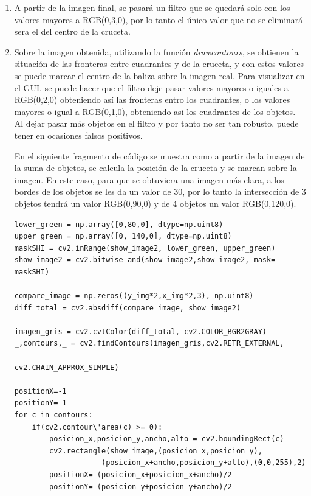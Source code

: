 \begin{enumerate}
	\item A partir de la imagen final, se pasar\'a un filtro que se quedar\'a solo con los valores mayores a RGB(0,3,0), por lo tanto el \'unico valor que no se eliminar\'a sera el del centro de la cruceta.

	\item Sobre la imagen obtenida, utilizando la funci\'on \textit{drawcontours}, se obtienen la situaci\'on de las fronteras entre cuadrantes y de la cruceta, y con estos valores se puede marcar el centro de la baliza sobre la imagen real. Para visualizar en el GUI, se puede hacer que el filtro deje pasar valores mayores o iguales a RGB(0,2,0) obteniendo as\'i las fronteras entro los cuadrantes, o los valores mayores o igual a RGB(0,1,0), obteniendo asi los cuadrantes de los objetos. Al dejar pasar m\'as objetos en el filtro y por tanto no ser tan robusto, puede tener en ocasiones falsos positivos.

\hspace{1 cm}En el siguiente fragmento de c\'odigo se muestra como a partir de la imagen de la suma de objetos, se calcula la posici\'on de la cruceta y se marcan sobre la imagen. En este caso, para que se obtuviera una imagen m\'as clara, a los bordes de los objetos se les da un valor de 30, por lo tanto la intersecci\'on de 3 objetos tendr\'a un valor RGB(0,90,0) y de 4 objetos un valor RGB(0,120,0).

\begin{lstlisting}[backgroundcolor=\color{yellow}]
lower_green = np.array([0,80,0], dtype=np.uint8) 
upper_green = np.array([0, 140,0], dtype=np.uint8) 
maskSHI = cv2.inRange(show_image2, lower_green, upper_green)
show_image2 = cv2.bitwise_and(show_image2,show_image2, mask= maskSHI)

compare_image = np.zeros((y_img*2,x_img*2,3), np.uint8)
diff_total = cv2.absdiff(compare_image, show_image2)

imagen_gris = cv2.cvtColor(diff_total, cv2.COLOR_BGR2GRAY)
_,contours,_ = cv2.findContours(imagen_gris,cv2.RETR_EXTERNAL, 
                                             cv2.CHAIN_APPROX_SIMPLE)

positionX=-1
positionY=-1
for c in contours:
    if(cv2.contour\'area(c) >= 0):
        posicion_x,posicion_y,ancho,alto = cv2.boundingRect(c) 
        cv2.rectangle(show_image,(posicion_x,posicion_y),
                    (posicion_x+ancho,posicion_y+alto),(0,0,255),2)
        positionX= (posicion_x+posicion_x+ancho)/2
        positionY= (posicion_y+posicion_y+ancho)/2
\end{lstlisting}

\end{enumerate}

